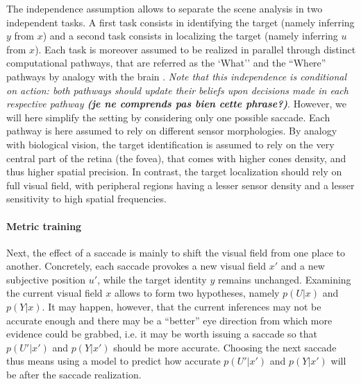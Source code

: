 The independence assumption allows to separate the scene analysis in two independent tasks. A first task consists in identifying the target (namely inferring $y$ from $x$) and a second task consists in localizing the target (namely inferring $u$ from $x$). Each task is moreover assumed to be realized in parallel through distinct computational pathways, that are referred as the  
`What'' and the ``Where'' pathways by analogy with the brain\ICANN
{}. \emph{Note that %
this independence is conditional on action: both pathways should update their beliefs upon decisions made in each respective pathway {\bf (je ne comprends pas bien cette phrase?)}}\fi. However, we will here  simplify the setting by considering only one possible saccade.
\ICANN
\else
Each pathway is here assumed to rely on different sensor morphologies. By analogy with biological vision, the target identification is assumed to rely on the very central part of the retina (the fovea), that comes with higher cones density, and thus higher spatial precision. In contrast, the target localization should rely on full visual field, with peripheral regions having a lesser sensor density and a lesser sensitivity to high spatial frequencies. 
\fi

\paragraph{Metric training}
Next, the effect of a saccade is mainly to shift the visual field from one place to another. Concretely, each saccade provokes a new visual field $x'$ and a new subjective position $u'$, while the target identity $y$ remains unchanged. Examining the current visual field $x$ allows to form two hypotheses, namely $p(U|x)$ and $p(Y|x)$. It may happen, however, that the current inferences may not be accurate enough and there may be a ``better'' eye direction from which more evidence could be grabbed, i.e. it may be worth issuing a saccade so that $p(U'|x')$ and $p(Y|x')$ should be more accurate. Choosing the next saccade thus means using a model to predict how accurate $p(U'|x')$ and $p(Y|x')$ will be after the saccade realization. 


